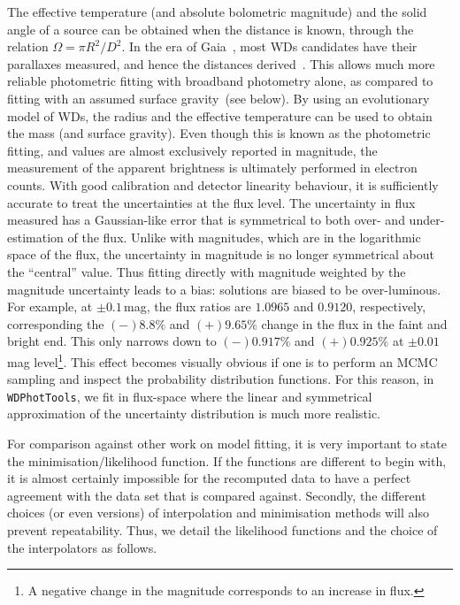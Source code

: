 \documentclass[fleqn,usenatbib]{rasti}
\begin{document}
The effective temperature (and absolute bolometric magnitude) and the solid
angle of a source can be obtained when the distance is known, through the
relation $\Omega = \pi R^2 / D^2$. In the era of
Gaia~\citep{2021A&A...649A...1G}, most WDs candidates have their parallaxes
measured, and hence the distances derived~\citep{2021AJ....161..147B}. This
allows much more reliable photometric fitting with broadband photometry alone,
as compared to fitting with an assumed surface gravity~(see below). By using
an evolutionary model of WDs, the radius and the effective temperature can be
used to obtain the mass (and surface gravity). Even though this is known as
the photometric fitting, and values are almost exclusively reported in
magnitude, the measurement of the apparent brightness is ultimately performed
in electron counts. With good calibration and detector linearity behaviour, it
is sufficiently accurate to treat the uncertainties at the flux level. The
uncertainty in flux measured has a Gaussian-like error that is symmetrical
to both over- and under-estimation of the flux. Unlike with magnitudes,
which are in the logarithmic space of the flux, the uncertainty in magnitude
is no longer symmetrical about the ``central'' value. Thus fitting directly
with magnitude weighted by the magnitude uncertainty leads to a bias: solutions
are biased to be over-luminous. For example, at $\pm0.1$\,mag, the flux
ratios are $1.0965$ and $0.9120$, respectively, corresponding the $(-)8.8\%$
and $(+)9.65\%$ change in the flux in the faint and bright end. This only
narrows down to $(-)0.917\%$ and $(+)0.925\%$ at $\pm0.01\,$mag
level\footnote{A negative change in the magnitude corresponds to an increase in
flux.}. This effect becomes visually obvious if one is to perform an MCMC
sampling and inspect the probability distribution functions. For this reason,
in \verb+WDPhotTools+, we fit in flux-space where the linear and symmetrical
approximation of the uncertainty distribution is much more realistic.

For comparison against other work on model fitting, it is very important to
state the minimisation/likelihood function. If the functions are different to
begin with, it is almost certainly impossible for the recomputed data to
have a perfect agreement with the data set that is compared against. Secondly, the
different choices (or even versions) of interpolation and minimisation methods
will also prevent repeatability. Thus, we detail the likelihood functions
and the choice of the interpolators as follows.
\end{document}
